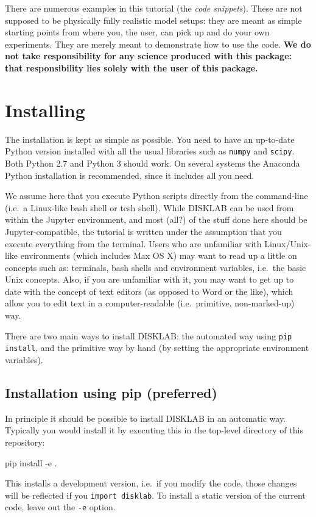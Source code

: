 \documentclass{book}
\newcommand{\code}[1]{{\small\tt #1}}
\begin{document}
There are numerous examples in this tutorial (the {\em code snippets}). These are
not supposed to be physically fully realistic model setups: they are meant as simple
starting points from where you, the user, can pick up and do your own experiments.
They are merely meant to demonstrate how to use the code. {\bf We do not take
  responsibility for any science produced with this package: that responsibility
lies solely with the user of this package.}

\section{Installing}
The installation is kept as simple as possible. You need to have an up-to-date
Python version installed with all the usual libraries such as \code{numpy} and
\code{scipy}. Both Python 2.7 and Python 3 should work.  On several systems the
     {\sf Anaconda} Python installation is recommended, since it includes all
     you need.

We assume here that you execute Python scripts directly from the command-line
(i.e.~a Linux-like bash shell or tcsh shell). While {\sf DISKLAB} can be used
from within the {\sf Jupyter} environment, and most (all?) of the stuff done
here should be {\sf Jupyter}-compatible, the tutorial is written under the
assumption that you execute everything from the terminal. Users who are
unfamiliar with Linux/Unix-like environments (which includes Max OS X) may want
to read up a little on concepts such as: terminals, bash shells and environment
variables, i.e.\ the basic Unix concepts. Also, if you are unfamiliar with it,
you may want to get up to date with the concept of text editors (as opposed to
{\sf Word} or the like), which allow you to edit text in a computer-readable
(i.e.\ primitive, non-marked-up) way.

There are two main ways to install {\sf DISKLAB}: the automated way using
\code{pip install}, and the primitive way by hand (by setting the appropriate
environment variables).

\subsection{Installation using pip (preferred)}
In principle it should be possible to install {\sf DISKLAB} in an automatic
way. Typically you would install it by executing this in the top-level directory
of this repository:
\begin{codebox}
pip install -e .
\end{codebox}
This installs a development version, i.e.\ if you modify the code, those changes
will be reflected if you \code{import disklab}. To install a static version of the
current code, leave out the \code{-e} option.
\end{document}
